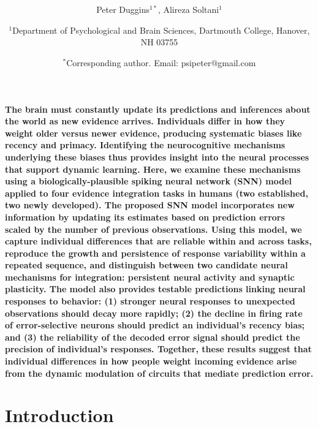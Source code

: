 \documentclass[12pt]{article}
\date{}
\title{\bfseries \boldmath \scititle}
\author{
	Peter Duggins$^{1\ast}$,
	Alireza Soltani$^{1}$\and
	\small$^{1}$Department of Psychological and Brain Sciences, Dartmouth College, Hanover, NH 03755\and
	\small$^\ast$Corresponding author. Email: psipeter@gmail.com
}
\renewenvironment{abstract}
	{\quotation}
	{\endquotation}
\begin{document}
\maketitle

\begin{abstract} \bfseries \boldmath
The brain must constantly update its predictions and inferences about the world as new evidence arrives. Individuals differ in how they weight older versus newer evidence, producing systematic biases like recency and primacy. Identifying the neurocognitive mechanisms underlying these biases thus provides insight into the neural processes that support dynamic learning. Here, we examine these mechanisms using a biologically-plausible spiking neural network (SNN) model applied to four evidence integration tasks in humans (two established, two newly developed). The proposed SNN model incorporates new information by updating its estimates based on prediction errors scaled by the number of previous observations. Using this model, we capture individual differences that are reliable within and across tasks, reproduce the growth and persistence of response variability within a repeated sequence, and distinguish between two candidate neural mechanisms for integration: persistent neural activity and synaptic plasticity. The model also provides testable predictions linking neural responses to behavior: (1) stronger neural responses to unexpected observations should decay more rapidly; (2) the decline in firing rate of error-selective neurons should predict an individual’s recency bias; and (3) the reliability of the decoded error signal should predict the precision of individual's responses. Together, these results suggest that individual differences in how people weight incoming evidence arise from the dynamic modulation of circuits that mediate prediction error.
\end{abstract}

\section{Introduction}
\end{document}
